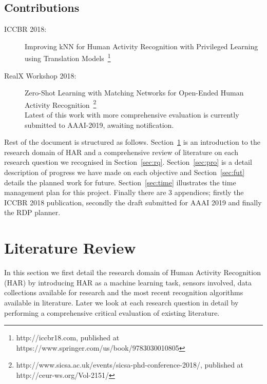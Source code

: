 \documentclass[runningheads]{llncs}
\begin{document}
\subsection{Contributions}
\begin{description}
\item[ICCBR 2018:]Improving kNN for Human Activity Recognition with Privileged Learning using Translation Models~\footnote{http://iccbr18.com, published at https://www.springer.com/us/book/9783030010805}
\item[RealX Workshop 2018:]Zero-Shot Learning with Matching Networks for Open-Ended Human Activity Recognition~\footnote{http://www.sicsa.ac.uk/events/sicsa-phd-conference-2018/, published at http://ceur-ws.org/Vol-2151/}\\
Latest of this work with more comprehensive evaluation is currently submitted to AAAI-2019, awaiting notification.
\end{description}

\noindent Rest of the document is structured as follows. Section~\ref{sec:lit} is an introduction to the research domain of HAR and a comprehensive review of literature on each research question we recognised in Section~\ref{sec:rq}. Section~\ref{sec:pro} is a detail description of progress we have made on each objective and Section~\ref{sec:fut} details the planned work for future. Section~\ref{sec:time} illustrates the time management plan for this project. Finally there are 3 appendices; firstly the ICCBR 2018 publication, secondly the draft submitted for AAAI 2019 and finally the RDP planner.  

\clearpage

\section{Literature Review} 
\label{sec:lit}
In this section we first detail the research domain of Human Activity Recognition (HAR) by introducing HAR as a machine learning task, sensors involved, data collections available for research and the most recent recognition algorithms available in literature. Later we look at each research question in detail by performing a comprehensive critical evaluation of existing literature. 
\end{document}
